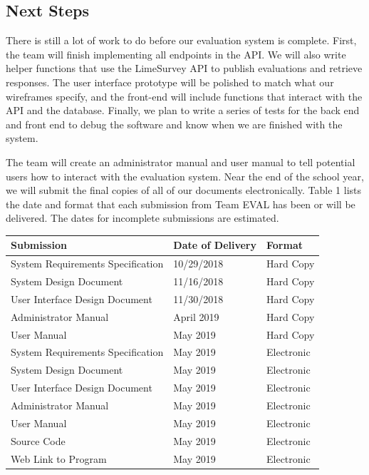 \documentclass{article}
\begin{document}
\subsection{Next Steps}

There is still a lot of work to do before our evaluation system is complete. First, the team will finish implementing all endpoints in the API. We will also write helper functions that use the LimeSurvey API to publish evaluations and retrieve responses. The user interface prototype will be polished to match what our wireframes specify, and the front-end will include functions that interact with the API and the database. Finally, we plan to write a series of tests for the back end and front end to debug the software and know when we are finished with the system.

The team will create an administrator manual and user manual to tell potential users how to interact with the evaluation system. Near the end of the school year, we will submit the final copies of all of our documents electronically. Table 1 lists the date and format that each submission from Team EVAL has been or will be delivered. The dates for incomplete submissions are estimated.

\begin{center}
\begin{tabular}{|p{6cm}|p{3cm}|p{3cm}|} 
\hline
\textbf{Submission} & \textbf{Date of Delivery} & \textbf{Format} \\
\hline
System Requirements Specification & 10/29/2018 & Hard Copy\\ 
\hline
System Design Document & 11/16/2018 & Hard Copy\\ 
\hline
User Interface Design Document & 11/30/2018 & Hard Copy\\ 
\hline
Administrator Manual & April 2019 & Hard Copy\\ 
\hline
User Manual & May 2019 & Hard Copy\\ 
\hline
System Requirements Specification & May 2019 & Electronic\\ 
\hline
System Design Document & May 2019 & Electronic\\ 
\hline
User Interface Design Document & May 2019 & Electronic\\ 
\hline
Administrator Manual & May 2019 & Electronic\\ 
\hline
User Manual & May 2019 & Electronic\\ 
\hline
Source Code & May 2019 & Electronic\\ 
\hline
Web Link to Program & May 2019 & Electronic\\ 
\hline
\end{tabular}
\end{center}
\end{document}
